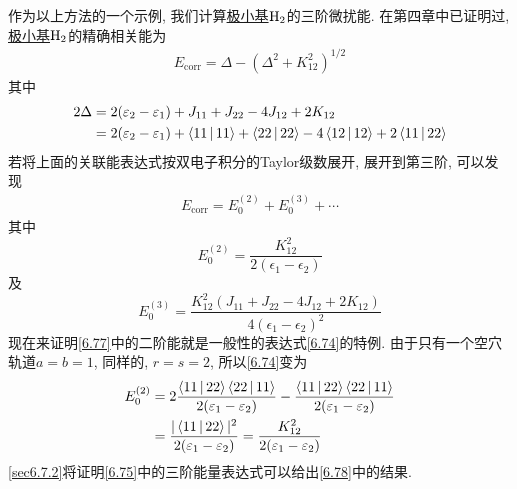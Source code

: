 作为以上方法的一个示例, 我们计算\underline{极小基$\mathrm{H}_2$}的三阶微扰能. 在第四章中已证明过, \underline{极小基$\mathrm{H}_2$}的精确相关能为
\begin{align}
E_\mathrm{corr} = \Delta - (\Delta^2 + K_{12}^2)^{1/2}
\label{6.76}
\end{align}
其中
\begin{align*}
2\Delta & = 2(\varepsilon_2-\varepsilon_1) + J_{11} + J_{22} - 4J_{12} + 2K_{12}\\
        & = 2(\varepsilon_2-\varepsilon_1) + \Braket{11|11} + \Braket{22|22} - 4\Braket{12|12} + 2\Braket{11|22}
\end{align*}
若将上面的关联能表达式按双电子积分的Taylor级数展开, 展开到第三阶, 可以发现
\begin{align*}
E_\mathrm{corr}  = E_0^{(2)} + E_0^{(3)} + \cdots
\end{align*}
其中
\begin{equation}
E_0^{(2)} = \frac{K_{12}^2}{2(\epsilon_1-\epsilon_2)}
\label{6.77}
\end{equation}
及
\begin{equation}
E_0^{(3)} = \frac{K_{12}^2(J_{11}+J_{22}-4J_{12}+2K_{12})}{4(\epsilon_1-\epsilon_2)^2}
\label{6.78}
\end{equation}
现在来证明\eqref{6.77}中的二阶能就是一般性的表达式\eqref{6.74}的特例. 由于只有一个空穴轨道$a=b=1$,  同样的, $r=s=2$, 所以\eqref{6.74}变为
\begin{align*}
E_0^{(2)} & = 2\frac{\Braket{11|22}\Braket{22|11}}{2(\varepsilon_1-\varepsilon_2)} - \frac{\Braket{11|22}\Braket{22|11}}{2(\varepsilon_1-\varepsilon_2)} \\
          & = \frac{|\Braket{11|22}|^2}{2(\varepsilon_1-\varepsilon_2)} = \frac{K_{12}^2}{2(\varepsilon_1-\varepsilon_2)}
\end{align*}
\ref{sec6.7.2}将证明\eqref{6.75}中的三阶能量表达式可以给出\eqref{6.78}中的结果.

